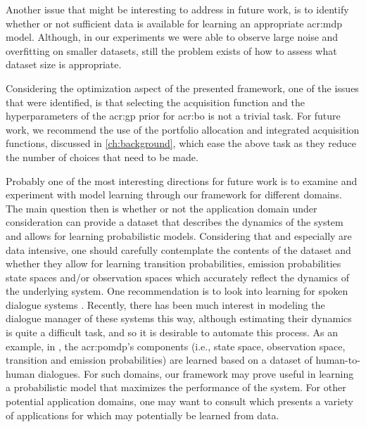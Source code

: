 Another issue that might be interesting to address in future work, is to identify whether or not sufficient data is available for learning an appropriate \acrshort{acr:mdp} model.
Although, in our experiments we were able to observe large noise and overfitting on smaller datasets, still the problem exists of how to assess what dataset size is appropriate.

Considering the optimization aspect of the presented framework, one of the issues that were identified, is that selecting the acquisition function and the hyperparameters of the \acrshort{acr:gp} prior for \acrshort{acr:bo} is not a trivial task.
For future work, we recommend the use of the portfolio allocation \cite{Hoffman2011, shahriari2016taking} and integrated acquisition \cite{snoek2012practical} functions, discussed in \autoref{ch:background}, which ease the above task as they reduce the number of choices that need to be made.

Probably one of the most interesting directions for future work is to examine and experiment with model learning through our framework for different domains.
The main question then is whether or not the application domain under consideration can provide a dataset that describes the dynamics of the system and allows for learning probabilistic models.
Considering that  and especially  are data intensive, one should carefully contemplate the contents of the dataset and whether they allow for learning transition probabilities, emission probabilities state spaces and/or observation spaces which accurately reflect the dynamics of the underlying system.
One recommendation is to look into learning  for spoken dialogue systems \cite{chinaei2011, png2011bayesian, young2016}.
Recently, there has been much interest in modeling the dialogue manager of these systems this way, although estimating their dynamics is quite a difficult task, and so it is desirable to automate this process.
As an example, in \cite{chinaei2011}, the \acrshort{acr:pomdp}'s components (i.e., state space, observation space, transition and emission probabilities) are learned based on a dataset of human-to-human dialogues.
For such domains, our framework may prove useful in learning a probabilistic model that maximizes the performance of the system.
For other potential application domains, one may want to consult \cite{cassandra1998spa} which presents a variety of applications for  which may potentially be learned from data.

